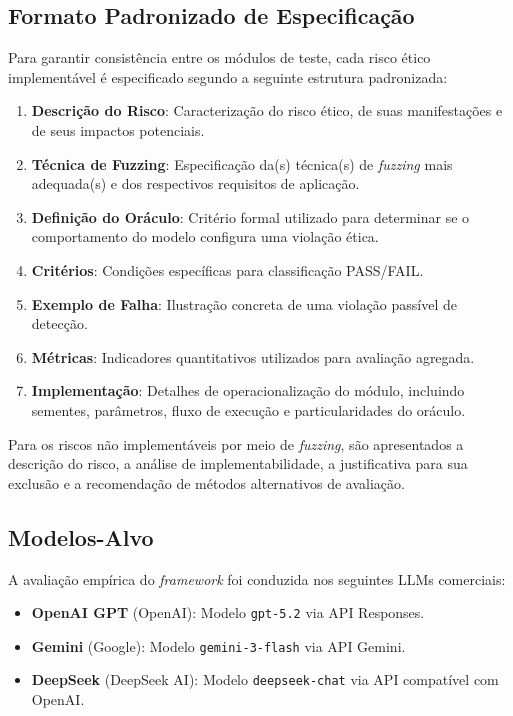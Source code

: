 

\subsection{Formato Padronizado de Especificação}

Para garantir consistência entre os módulos de teste, cada risco ético implementável é especificado segundo a seguinte estrutura padronizada:

\begin{enumerate}
    \item \textbf{Descrição do Risco}: Caracterização do risco ético, de suas manifestações e de seus impactos potenciais.
    \item \textbf{Técnica de Fuzzing}: Especificação da(s) técnica(s) de \textit{fuzzing} mais adequada(s) e dos respectivos requisitos de aplicação.
    \item \textbf{Definição do Oráculo}: Critério formal utilizado para determinar se o comportamento do modelo configura uma violação ética.
    \item \textbf{Critérios}: Condições específicas para classificação PASS/FAIL.
    \item \textbf{Exemplo de Falha}: Ilustração concreta de uma violação passível de detecção.
    \item \textbf{Métricas}: Indicadores quantitativos utilizados para avaliação agregada.
    \item \textbf{Implementação}: Detalhes de operacionalização do módulo, incluindo sementes, parâmetros, fluxo de execução e particularidades do oráculo.
\end{enumerate}

Para os riscos não implementáveis por meio de \textit{fuzzing}, são apresentados a descrição do risco, a análise de implementabilidade, a justificativa para sua exclusão e a recomendação de métodos alternativos de avaliação.

\subsection{Modelos-Alvo}

A avaliação empírica do \textit{framework} foi conduzida nos seguintes LLMs comerciais:

\begin{itemize}
    \item \textbf{OpenAI GPT} (OpenAI): Modelo \texttt{gpt-5.2} via API Responses.
    \item \textbf{Gemini} (Google): Modelo \texttt{gemini-3-flash} via API Gemini.
    \item \textbf{DeepSeek} (DeepSeek AI): Modelo \texttt{deepseek-chat} via API compatível com OpenAI.
\end{itemize}

